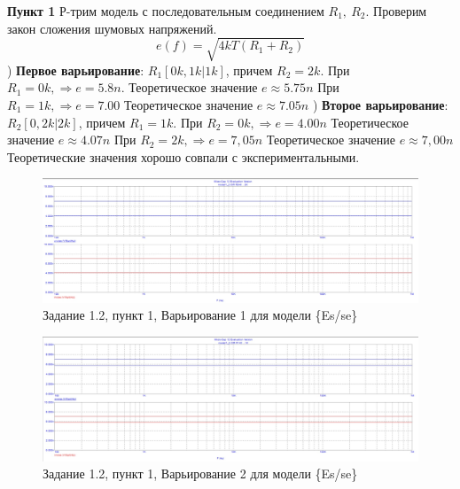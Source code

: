 \documentclass[a4paper, 14pt]{extarticle}%
\begin{document}
\textbf{Пункт 1}
Р-трим модель с последовательным соединением $R_1, \: R_2$.
\newline
Проверим закон сложения шумовых напряжений.
\[ e(f) = \sqrt{4kT(R_1 + R_2)} \]
) \textbf{Первое варьирование}: $R_1[0k, 1k | 1k]$, причем $R_2 = 2k$.
\newline
При $R_1 = 0k, \Rightarrow  e = 5.8n$.
Теоретическое значение $e \approx 5.75n$
\newline
При $R_1 = 1k, \Rightarrow  e = 7.00$
Теоретическое значение $e \approx 7.05n$
) \textbf{Второе варьирование}: $R_2[0, 2k | 2k]$, причем $R_1 = 1k$.
\newline
При $R_2 = 0k, \Rightarrow  e = 4.00n$
Теоретическое значение $e \approx 4.07n$
\newline
При $R_2 = 2k, \Rightarrow  e = 7,05n$
Теоретическое значение $e \approx 7,00n$
\newline
Теоретические значения хорошо совпали с экспериментальными.
\newline
\begin{figure}[h!]
			\centering
			\includegraphics[width=1.1\linewidth]{1.2/pic4.jpg}
			\caption{Задание 1.2, пункт 1, Варьирование 1 для модели \{Es/se\}}
			\label{A}
\end{figure}
\newline
\begin{figure}[h!]
			\centering
			\includegraphics[width=1.1\linewidth]{1.2/pic5.jpg}
			\caption{Задание 1.2, пункт 1, Варьирование 2 для модели \{Es/se\}}
			\label{A}
\end{figure}
\end{document}
